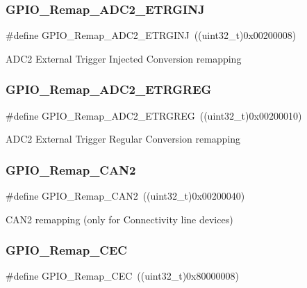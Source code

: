 \subsubsection{\texorpdfstring{GPIO\_Remap\_ADC2\_ETRGINJ}{GPIO\_Remap\_ADC2\_ETRGINJ}}
{\footnotesize\ttfamily \#define G\+P\+I\+O\+\_\+\+Remap\+\_\+\+A\+D\+C2\+\_\+\+E\+T\+R\+G\+I\+NJ~((uint32\+\_\+t)0x00200008)}

A\+D\+C2 External Trigger Injected Conversion remapping \mbox{\label{group___g_p_i_o___remap__define_gaa782a0c482f34507c82e4cd639bb747e}} 
\subsubsection{\texorpdfstring{GPIO\_Remap\_ADC2\_ETRGREG}{GPIO\_Remap\_ADC2\_ETRGREG}}
{\footnotesize\ttfamily \#define G\+P\+I\+O\+\_\+\+Remap\+\_\+\+A\+D\+C2\+\_\+\+E\+T\+R\+G\+R\+EG~((uint32\+\_\+t)0x00200010)}

A\+D\+C2 External Trigger Regular Conversion remapping \mbox{\label{group___g_p_i_o___remap__define_ga14c09a5050063b703fa07181afc56ee6}} 
\subsubsection{\texorpdfstring{GPIO\_Remap\_CAN2}{GPIO\_Remap\_CAN2}}
{\footnotesize\ttfamily \#define G\+P\+I\+O\+\_\+\+Remap\+\_\+\+C\+A\+N2~((uint32\+\_\+t)0x00200040)}

C\+A\+N2 remapping (only for Connectivity line devices) \mbox{\label{group___g_p_i_o___remap__define_gac5961690908d4a0737e82b5a7d271b9b}} 
\subsubsection{\texorpdfstring{GPIO\_Remap\_CEC}{GPIO\_Remap\_CEC}}
{\footnotesize\ttfamily \#define G\+P\+I\+O\+\_\+\+Remap\+\_\+\+C\+EC~((uint32\+\_\+t)0x80000008)}

